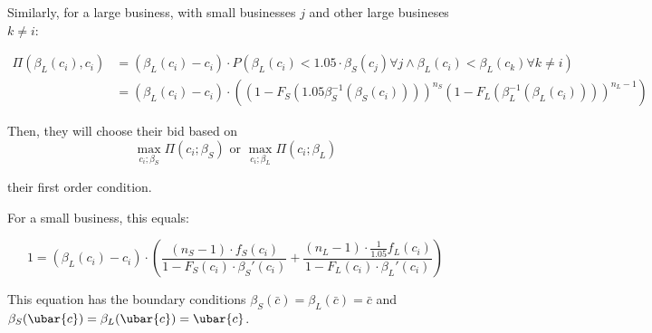 Similarly, for a large business, with small businesses \(j\) and other
large busineses \(k \ne i\):

\[
  \begin{aligned}
  \Pi(\beta_L (c_i), c_i) &= (\beta_L(c_i) - c_i) \cdot
    P \left( \beta_L (c_i) < 1.05 \cdot \beta_S(c_j) \forall j \land
    \beta_L (c_i) < \beta_L(c_k) \forall k \ne i \right) \\
  &= (\beta_L(c_i) - c_i) \cdot \left(
    \left( 1 - F_S(1.05 \beta_{S}^{-1}(\beta_S(c_i))) \right)^{n_S}
    \left( 1 - F_L(\beta_{L}^{-1}(\beta_{L}(c_i))) \right)^{n_L - 1} \right)
  \end{aligned}
\]

Then, they will choose their bid based on
\[
  \max_{c_i; \beta_S} \Pi(c_i; \beta_S)
  \text{ or }
  \max_{c_i; \beta_L} \Pi(c_i; \beta_L)
\]

their first order condition.

For a small business, this equals:

\[
  1 = (\beta_L(c_i) - c_i) \cdot \left(
    \frac{(n_S - 1) \cdot f_S(c_i)}{1 - F_S(c_i) \cdot \beta_S'(c_i)} +
    \frac{(n_L - 1) \cdot \frac{1}{1.05} f_L(c_i)}{1 - F_L(c_i) \cdot \beta_L'(c_i)} \right)
\]

This equation has the boundary conditions
\(\beta_S (\bar{c}) = \beta_L (\bar{c}) = \bar{c}\) and
\( \beta_S( \ubar{c} ) = \beta_L( \ubar{c} ) = \ubar{c} \).